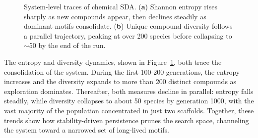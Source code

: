 \documentclass[life,article,submit,pdftex,moreauthors]{Definitions/mdpi}
\begin{document}
\begin{figure}[H]
\centering
{}
\hfill
{}
\caption{System-level traces of chemical SDA. (\textbf{a}) Shannon entropy rises sharply as new compounds appear, then declines steadily as dominant motifs consolidate. (\textbf{b}) Unique compound diversity follows a parallel trajectory, peaking at over 200 species before collapsing to $\sim$50 by the end of the run.}
\label{fig:chem-entropy-diversity}
\end{figure}

The entropy and diversity dynamics, shown in Figure~\ref{fig:chem-entropy-diversity}, both trace the consolidation of the system. During the first 100-200 generations, the entropy increases and the diversity expands to more than 200 distinct compounds as exploration dominates. Thereafter, both measures decline in parallel: entropy falls steadily, while diversity collapses to about 50 species by generation 1000, with the vast majority of the population concentrated in just two scaffolds. Together, these trends show how stability-driven persistence prunes the search space, channeling the system toward a narrowed set of long-lived motifs.
\end{document}
